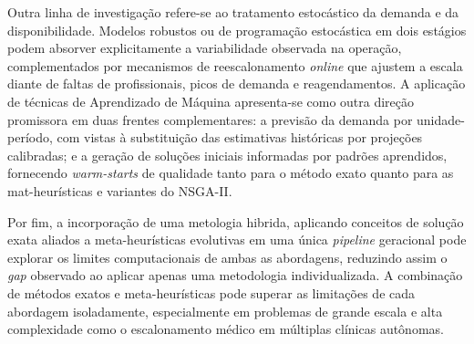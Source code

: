 Outra linha de investigação refere-se ao tratamento estocástico da demanda e da disponibilidade. Modelos robustos ou de programação estocástica em dois estágios podem absorver explicitamente a variabilidade observada na operação, complementados por mecanismos de reescalonamento \textit{online} que ajustem a escala diante de faltas de profissionais, picos de demanda e reagendamentos. A aplicação de técnicas de Aprendizado de Máquina apresenta-se como outra direção promissora em duas frentes complementares: a previsão da demanda por unidade-período, com vistas à substituição das estimativas históricas por projeções calibradas; e a geração de soluções iniciais informadas por padrões aprendidos, fornecendo \textit{warm-starts} de qualidade tanto para o método exato quanto para as mat-heurísticas e variantes do NSGA-II.

Por fim, a incorporação de uma metologia hibrida, aplicando conceitos de solução exata aliados a meta-heurísticas evolutivas em uma única \textit{pipeline} geracional pode explorar os limites computacionais de ambas as abordagens, reduzindo assim o \textit{gap} observado ao aplicar apenas uma metodologia individualizada. A combinação de métodos exatos e meta-heurísticas pode superar as limitações de cada abordagem isoladamente, especialmente em problemas de grande escala e alta complexidade como o escalonamento médico em múltiplas clínicas autônomas.